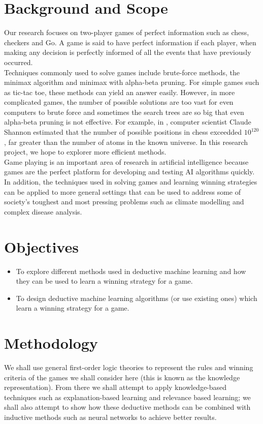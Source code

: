 \documentclass[11pt]{article}
\begin{document}
\section{Background and Scope}
Our research focuses on two-player games of perfect information such as chess, checkers and Go. A game is said to have perfect information if each player, when making any decision is perfectly informed of all the events that have previously occurred. \\

Techniques commonly used to solve games include brute-force methods, the minimax algorithm and minimax with alpha-beta pruning. For simple games such as tic-tac toe, these methods can yield an answer easily. However, in more complicated games, the number of possible solutions are too vast for even computers to brute force and sometimes the search trees are so big that even alpha-beta pruning is not effective. For example, in \cite{Shannon:1950:PCP}, computer scientist Claude Shannon estimated that the number of possible positions in chess exceedded ${10}^{120}$, far greater than the number of atoms in the known universe. In this research project, we hope to explorer more efficient methods.\\

Game playing is an important area of research in artificial intelligence because games are the perfect platform for developing and testing AI algorithms quickly. In addition, the techniques used in solving games and learning winning strategies can be applied to more general settings that can be used to address some of society's toughest and most pressing problems such as climate modelling and complex disease analysis.

\section{Objectives}
\begin{itemize}
\item To explore different methods used in deductive machine learning and how they can be used to learn a winning strategy for a game.
\item To design deductive machine learning algorithms (or use existing ones) which learn a winning strategy for a game.
\end{itemize}

\section{Methodology}
We shall use general first-order logic theories to represent the rules and winning criteria of the games we shall consider here (this is known as the knowledge representation). From there we shall attempt to apply knowledge-based techniques such as explanation-based learning and relevance based learning; we shall also attempt to show how these deductive methods can be combined with inductive methods such as neural networks to achieve better results.\\
\end{document}
